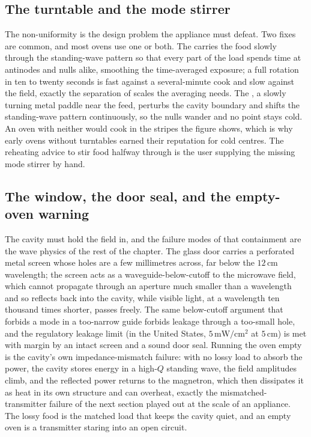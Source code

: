 \subsection{The turntable and the mode stirrer}

The non-uniformity is the design problem the appliance must defeat. Two
fixes are common, and most ovens use one or both. The 
carries the food slowly through the standing-wave pattern so that every
part of the load spends time at antinodes and nulls alike, smoothing the
time-averaged exposure; a full rotation in ten to twenty seconds is fast
against a several-minute cook and slow against the field, exactly the
separation of scales the averaging needs. The , a
slowly turning metal paddle near the feed, perturbs the cavity boundary
and shifts the standing-wave pattern continuously, so the nulls wander and
no point stays cold. An oven with neither would cook in the stripes the
figure shows, which is why early ovens without turntables earned their
reputation for cold centres. The reheating advice to stir food halfway
through is the user supplying the missing mode stirrer by hand.

\subsection{The window, the door seal, and the empty-oven warning}

The cavity must hold the field in, and the failure modes of that
containment are the wave physics of the rest of the chapter. The glass
door carries a perforated metal screen whose holes are a few millimetres
across, far below the $12\,\si{\centi\meter}$ wavelength; the screen acts
as a waveguide-below-cutoff to the microwave field, which cannot propagate
through an aperture much smaller than a wavelength and so reflects back
into the cavity, while visible light, at a wavelength ten thousand times
shorter, passes freely. The same below-cutoff argument that forbids a
mode in a too-narrow guide forbids leakage through a too-small hole, and
the regulatory leakage limit (in the United States, $5\,\si{\milli\watt
\per\centi\meter\squared}$ at $5\,\si{\centi\meter}$) is met with margin
by an intact screen and a sound door seal. Running the oven empty is the
cavity's own impedance-mismatch failure: with no lossy load to absorb the
power, the cavity stores energy in a high-$Q$ standing wave, the field
amplitudes climb, and the reflected power returns to the magnetron, which
then dissipates it as heat in its own structure and can overheat, exactly
the mismatched-transmitter failure of the next section played out at the
scale of an appliance. The lossy food is the matched load that keeps the
cavity quiet, and an empty oven is a transmitter staring into an open
circuit.

